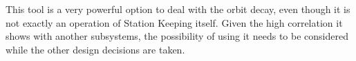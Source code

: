 This tool is a very powerful option to deal with the orbit decay, even though it is not exactly an operation of Station Keeping itself. Given the high correlation it shows with another subsystems, the possibility of using it needs to be considered while the other design decisions are taken.